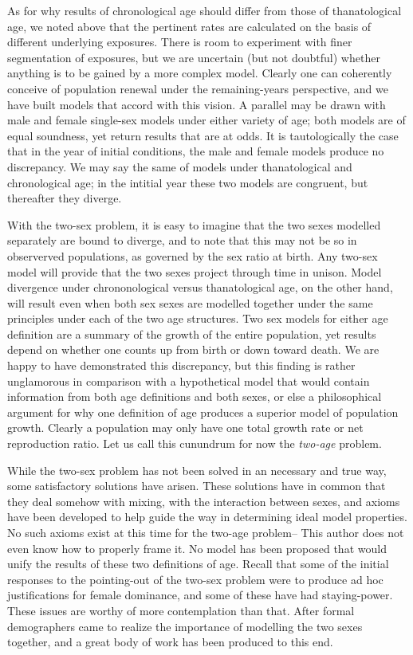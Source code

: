As for why results of chronological age should differ from those of
thanatological age, we noted above that the pertinent rates are calculated on
the basis of different underlying exposures. There is room to experiment with
 finer segmentation of exposures, but we are uncertain (but not doubtful)
 whether anything is to be gained by a more complex model. Clearly one can
coherently conceive of population renewal under the remaining-years
perspective, and we have built models that accord with this vision. A parallel
may be drawn with male and female single-sex models under either variety of
age; both models are of equal soundness, yet return results that are at odds. 
It is tautologically the case that in the year of initial conditions, the male and
female models produce no discrepancy. We may say the same of models under
thanatological and chronological age; in the intitial year these two models are
congruent, but thereafter they diverge.

With the two-sex problem, it is easy to imagine that the two sexes modelled
separately are bound to diverge, and to note that this may not be so in
observerved populations, as governed by the sex ratio at birth. Any two-sex
model will provide that the two sexes project through time in unison. Model
divergence under chrononological versus thanatological age, on the other hand,
will result even when both sex sexes are modelled together under the same principles under each
of the two age structures. Two sex models for either age definition are a
summary of the growth of the entire population, yet results depend on whether
one counts up from birth or down toward death. We are happy to have demonstrated
this discrepancy, but this finding is rather unglamorous in comparison with a
hypothetical model that would contain information from both age definitions and
both sexes, or else a philosophical argument for why one definition of age
produces a superior model of population growth. Clearly a population may only
have one total growth rate or net reproduction ratio. Let us call this cunundrum 
for now the \textit{two-age} problem.

While the two-sex problem has not been solved in an necessary and true way, some
satisfactory solutions have arisen. These solutions have in common that they
deal somehow with mixing, with the interaction between sexes, and axioms have
been developed to help guide the way in determining ideal model properties. No
such axioms exist at this time for the two-age problem-- This author does not
even know how to properly frame it. No model has been proposed
that would unify the results of these two definitions of age. Recall that some 
of the initial responses to the pointing-out of the two-sex problem
were to produce ad hoc justifications for female dominance, and some of these
have had staying-power. These issues are worthy of more contemplation than that.
After \citet{karmel1947relations} formal demographers came to realize the
importance of modelling the two sexes together, and a great body 
of work has been produced to this end. 
